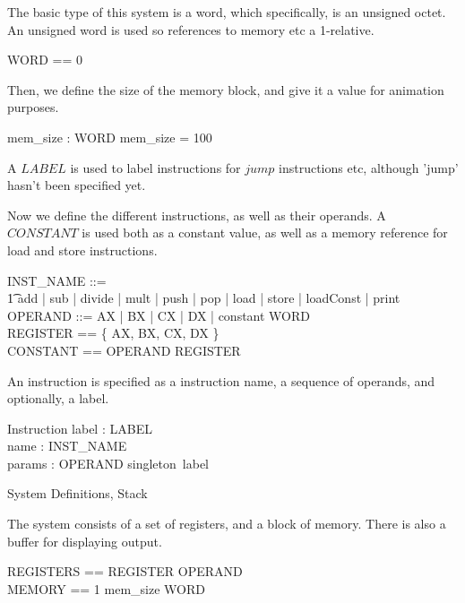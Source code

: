 \documentclass{article}
\begin{document}
The basic type of this system is a word, which specifically, is an
unsigned octet. An unsigned word is used so references to memory etc a
1-relative.

\begin{zed}
  WORD == 0 
\end{zed}

Then, we define the size of the memory block, and give it a value for
animation purposes.

\begin{axdef}
  mem\_size : WORD
\where
  mem\_size = 100
\end{axdef}

A $LABEL$ is used to label instructions for $jump$ instructions etc,
although 'jump' hasn't been specified yet.

\begin{zed}
  [LABEL]
\end{zed}

Now we define the different instructions, as well as their operands. A
$CONSTANT$ is used both as a constant value, as well as a memory
reference for load and store instructions.

\begin{zed}
  INST\_NAME ::= \\
    \t1 add | sub | divide | mult | push | pop |
      load | store | loadConst | print \\
  OPERAND ::= AX | BX | CX | DX | constant \ldata WORD \rdata\\
  REGISTER == \{ AX, BX, CX, DX \}\\
  CONSTANT == OPERAND \setminus REGISTER
\end{zed}

An instruction is specified as a instruction name, a sequence of
operands, and optionally, a label.

\begin{schema}{Instruction}
  label : \power LABEL \\
  name : INST\_NAME \\
  params : \seq OPERAND
\where
  singleton~label
\end{schema}

\begin{zsection}
  \SECTION System \parents Definitions, Stack
\end{zsection}

The system consists of a set of registers, and a block of
memory. There is also a buffer for displaying output.

\begin{zed}
  REGISTERS == REGISTER \fun OPERAND\\
  MEMORY == 1 \upto mem\_size \pfun WORD
\end{zed}
\end{document}
